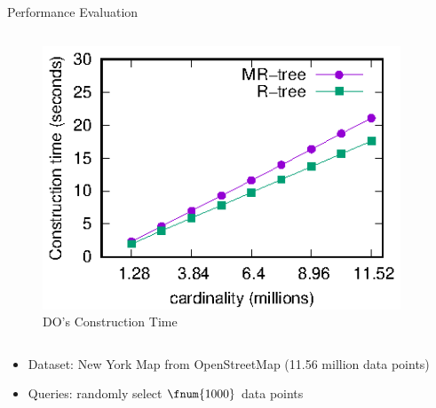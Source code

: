 \documentclass[xcolor={dvipsnames},aspectratio=169,10pt]{beamer}
\begin{document}
\begin{frame}{Performance Evaluation}
  \begin{columns}
    \begin{column}{0.5\linewidth}
      \begin{figure}
        \centering
        \includegraphics[width=0.8\linewidth]{exp-figs/knn/indexconstructtime.eps}
        \caption{DO's Construction Time}
      \end{figure}
    \end{column}
    \begin{column}{0.5\linewidth}
      \begin{table}
        \centering
        \caption{The Size of Index with Different Cardinalities}
      \end{table}
    \end{column}
  \end{columns}

  \begin{itemize}
    \item Dataset: New York Map from OpenStreetMap (11.56 million data points)
    \item Queries: randomly select $\fnum{1000}$ data points
  \end{itemize}
\end{frame}
\end{document}
